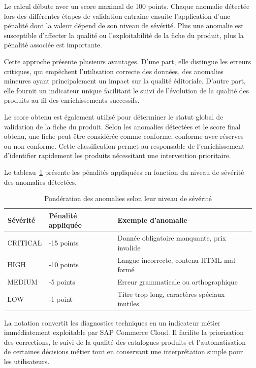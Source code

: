 Le calcul débute avec un score maximal de 100 points. Chaque anomalie détectée lors des différentes étapes de validation entraîne ensuite l'application d'une pénalité dont la valeur dépend de son niveau de sévérité. Plus une anomalie est susceptible d'affecter la qualité ou l'exploitabilité de la fiche du produit, plus la pénalité associée est importante.

Cette approche présente plusieurs avantages. D'une part, elle distingue les erreurs critiques, qui empêchent l'utilisation correcte des données, des anomalies mineures ayant principalement un impact sur la qualité éditoriale. D'autre part, elle fournit un indicateur unique facilitant le suivi de l'évolution de la qualité des produits au fil des enrichissements successifs.

Le score obtenu est également utilisé pour déterminer le statut global de validation de la fiche du produit. Selon les anomalies détectées et le score final obtenu, une fiche peut être considérée comme conforme, conforme avec réserves ou non conforme. Cette classification permet au responsable de l'enrichissement d'identifier rapidement les produits nécessitant une intervention prioritaire.

Le tableau~\ref{tab:ponderation_anomalies} présente les pénalités appliquées en fonction du niveau de sévérité des anomalies détectées.

\begin{table}[H]
\centering
\caption{Pondération des anomalies selon leur niveau de sévérité}
\label{tab:ponderation_anomalies}
\begin{tabular}{|p{3cm}|p{4cm}|p{7cm}|}
\hline
\textbf{Sévérité} & \textbf{Pénalité appliquée} & \textbf{Exemple d'anomalie} \\
\hline
CRITICAL & -15 points & Donnée obligatoire manquante, prix invalide \\
\hline
HIGH & -10 points & Langue incorrecte, contenu HTML mal formé \\
\hline
MEDIUM & -5 points & Erreur grammaticale ou orthographique \\
\hline
LOW & -1 point & Titre trop long, caractères spéciaux inutiles \\
\hline
\end{tabular}
\end{table}

La notation convertit les diagnostics techniques en un indicateur métier immédiatement exploitable par SAP Commerce Cloud. Il facilite la priorisation des corrections, le suivi de la qualité des catalogues produits et l'automatisation de certaines décisions métier tout en conservant une interprétation simple pour les utilisateurs.

